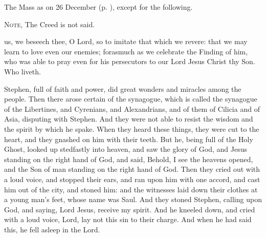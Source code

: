 

\clearpage
{}

\begin{rubric}
	The Mass as on 26 December (p. \pageref{SaintStephen}), except for the following.
\end{rubric}

\begin{rubric}
	\textsc{Note,} The Creed is not said.
\end{rubric}

\collect
{} us, we beseech thee, O Lord, so to imitate that which we revere: that we may learn to love even our enemies; forasmuch as we celebrate the Finding of him, who was able to pray even for his persecutors to our Lord Jesus Christ thy Son. Who liveth.

 Stephen, full of faith and power, did great wonders and miracles among the people. Then there arose certain of the synagogue, which is called the synagogue of the Libertines, and Cyrenians, and Alexandrians, and of them of Cilicia and of Asia, disputing with Stephen. And they were not able to resist the wisdom and the spirit by which he spake. When they heard these things, they were cut to the heart, and they gnashed on him with their teeth. But he, being full of the Holy Ghost, looked up stedfastly into heaven, and saw the glory of God, and Jesus standing on the right hand of God, and said, Behold, I see the heavens opened, and the Son of man standing on the right hand of God. Then they cried out with a loud voice, and stopped their ears, and ran upon him with one accord, and cast him out of the city, and stoned him: and the witnesses laid down their clothes at a young man’s feet, whose name was Saul. And they stoned Stephen, calling upon God, and saying, Lord Jesus, receive my spirit. And he kneeled down, and cried with a loud voice, Lord, lay not this sin to their charge. And when he had said this, he fell asleep in the Lord.


